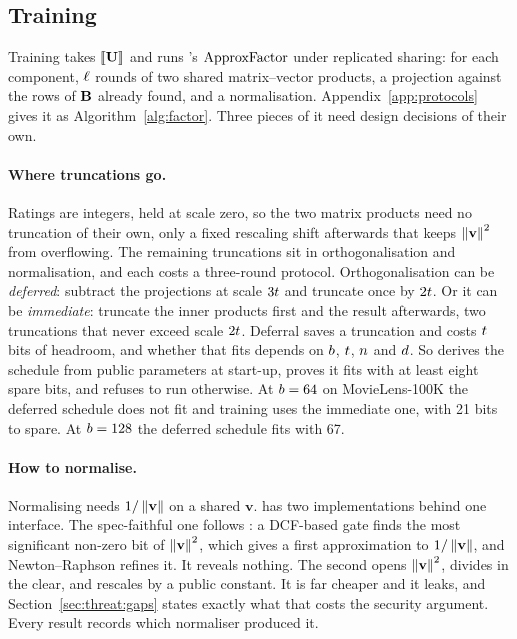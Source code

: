\subsection{Training}
\label{sec:design:train}

Training takes $\llbracket \mathbf{U} \rrbracket$ and runs \nudgeplain{}'s $\operatorname{ApproxFactor}$ under
replicated sharing: for each component, $\ell$ rounds of two shared
matrix--vector products, a projection against the rows of $\mathbf{B}$ already
found, and a normalisation. Appendix~\ref{app:protocols} gives it as
Algorithm~\ref{alg:factor}. Three pieces of it need design decisions of their
own.

\paragraph{Where truncations go.} Ratings are integers, held at scale zero, so the
two matrix products need no truncation of their own, only a fixed rescaling
shift afterwards that keeps $\left\lVert\mathbf{v}\right\rVert^2$ from overflowing. The remaining
truncations sit in orthogonalisation and normalisation, and each costs a
three-round protocol. Orthogonalisation can be \emph{deferred}: subtract the
projections at scale $3t$ and truncate once by $2t$. Or it can be
\emph{immediate}: truncate the inner products first and the result afterwards,
two truncations that never exceed scale $2t$. Deferral saves a
truncation and costs $t$ bits of headroom, and whether that fits depends
on $b$, $t$, $n$ and $d$. So \sys{} derives the schedule from
public parameters at start-up, proves it fits with at least eight spare bits, and
refuses to run otherwise. At $b = 64$ on MovieLens-100K the deferred schedule
does not fit and training uses the immediate one, with 21 bits to spare. At
$b = 128$ the deferred schedule fits with 67.

\paragraph{How to normalise.} Normalising needs $1/\left\lVert\mathbf{v}\right\rVert$ on a
shared $\mathbf{v}$. \sys{} has two implementations behind one interface. The
spec-faithful one follows \nudgeplain{}: a DCF-based gate finds the most
significant non-zero bit of $\left\lVert\mathbf{v}\right\rVert^2$, which gives a first
approximation to $1/\left\lVert\mathbf{v}\right\rVert$, and Newton--Raphson refines it. It
reveals nothing. The second opens $\left\lVert\mathbf{v}\right\rVert^2$, divides in the clear,
and rescales by a public constant. It is far cheaper and it leaks, and
Section~\ref{sec:threat:gaps} states exactly what that costs the security
argument. Every result records which normaliser produced it.

